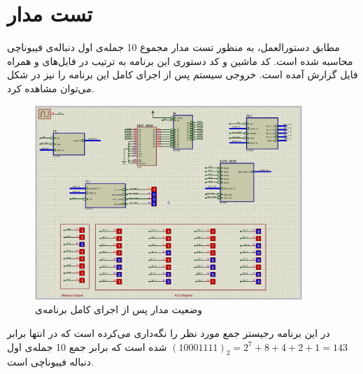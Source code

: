 \documentclass[12pt,onecolumn,a4paper,fleqn]{article}
\begin{document}
\section{تست مدار}
مطابق دستورالعمل، به منظور تست مدار مجموع 10 جمله‌ی اول دنباله‌ی فیبوناچی محاسبه شده است. کد ماشین و کد دستوری این برنامه به ترتیب در فایل‌های
و
همراه فایل گزارش آمده است. خروجی سیستم پس از اجرای کامل این برنامه را نیز در شکل
می‌توان مشاهده کرد.
\begin{figure}[H]
	\centering
	\includegraphics[width=0.9\textwidth]{source/fibo_final.png}
	\caption{وضعیت مدار پس از اجرای کامل برنامه‌ی }
	\label{fig:fibo}
\end{figure}
در این برنامه رجیستر
جمع مورد نظر را نگه‌داری می‌کرده است که در انتها برابر
$(10001111)_2 = 2^7 + 8 + 4 + 2 + 1 = 143$
شده است که برابر جمع 10 جمله‌ی اول دنباله فیبوناچی است.
\end{document}

